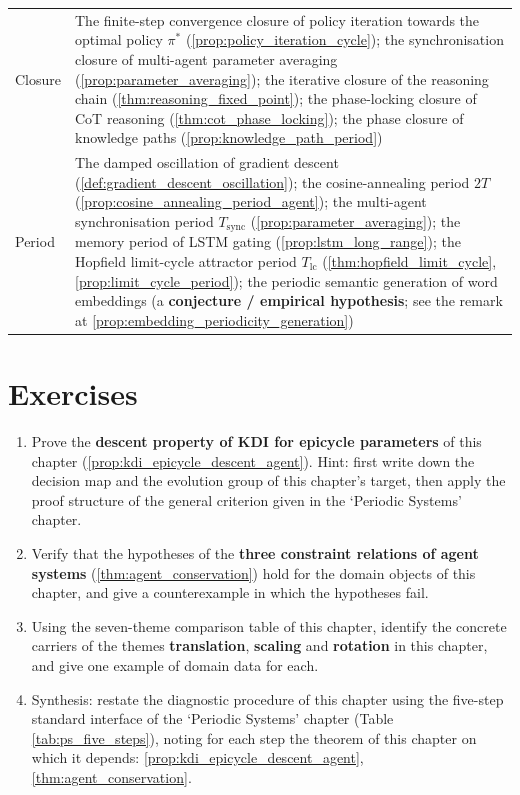 \begin{longtable}{>{\centering\arraybackslash}p{2.8cm}>{\raggedright\arraybackslash}p{9.9cm}}
Closure & The finite-step convergence closure of policy iteration towards the optimal policy $\pi^*$ (\cref{prop:policy_iteration_cycle}); the synchronisation closure of multi-agent parameter averaging (\cref{prop:parameter_averaging}); the iterative closure of the reasoning chain (\cref{thm:reasoning_fixed_point}); the phase-locking closure of CoT reasoning (\cref{thm:cot_phase_locking}); the phase closure of knowledge paths (\cref{prop:knowledge_path_period}) \\
Period & The damped oscillation of gradient descent (\cref{def:gradient_descent_oscillation}); the cosine-annealing period $2T$ (\cref{prop:cosine_annealing_period_agent}); the multi-agent synchronisation period $T_{\text{sync}}$ (\cref{prop:parameter_averaging}); the memory period of LSTM gating (\cref{prop:lstm_long_range}); the Hopfield limit-cycle attractor period $T_{\text{lc}}$ (\cref{thm:hopfield_limit_cycle}, \cref{prop:limit_cycle_period}); the periodic semantic generation of word embeddings (a \textbf{conjecture / empirical hypothesis}; see the remark at \cref{prop:embedding_periodicity_generation}) \\
\end{longtable}
\endgroup

\section*{Exercises}

\begin{enumerate}[leftmargin=3em, label=\textbf{Exercise \arabic*}]
    \item Prove the \textbf{descent property of KDI for epicycle parameters} of this chapter (\ref{prop:kdi_epicycle_descent_agent}). Hint: first write down the decision map and the evolution group of this chapter's target, then apply the proof structure of the general criterion given in the `Periodic Systems' chapter.

    \item Verify that the hypotheses of the \textbf{three constraint relations of agent systems} (\ref{thm:agent_conservation}) hold for the domain objects of this chapter, and give a counterexample in which the hypotheses fail.

    \item Using the seven-theme comparison table of this chapter, identify the concrete carriers of the themes \textbf{translation}, \textbf{scaling} and \textbf{rotation} in this chapter, and give one example of domain data for each.

    \item Synthesis: restate the diagnostic procedure of this chapter using the five-step standard interface of the `Periodic Systems' chapter (Table \ref{tab:ps_five_steps}), noting for each step the theorem of this chapter on which it depends: \ref{prop:kdi_epicycle_descent_agent}, \ref{thm:agent_conservation}.
\end{enumerate}


